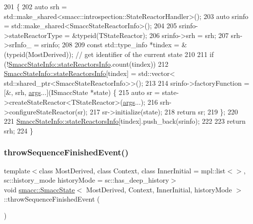 \begin{DoxyCode}
201   \{
202     \textcolor{keyword}{auto} srh = std::make\_shared<smacc::introspection::StateReactorHandler>();
203     \textcolor{keyword}{auto} srinfo = std::make\_shared<SmaccStateReactorInfo>();
204 
205     srinfo->stateReactorType = &\textcolor{keyword}{typeid}(TStateReactor);
206     srinfo->srh = srh;
207     srh->srInfo\_ = srinfo;
208 
209     \textcolor{keyword}{const} std::type\_info *tindex = &(\textcolor{keyword}{typeid}(MostDerived)); \textcolor{comment}{// get identifier of the current state}
210 
211     \textcolor{keywordflow}{if} (!\hyperlink{classsmacc_1_1introspection_1_1SmaccStateInfo_abd1d6ca5060c87f6bd11fde3e5b2ac4d}{SmaccStateInfo::stateReactorsInfo}.count(tindex))
212       \hyperlink{classsmacc_1_1introspection_1_1SmaccStateInfo_abd1d6ca5060c87f6bd11fde3e5b2ac4d}{SmaccStateInfo::stateReactorsInfo}[tindex] = std::vector<
      std::shared\_ptr<SmaccStateReactorInfo>>();
213 
214     srinfo->factoryFunction = [&, srh, \hyperlink{namespacegenerate__debs_a75f9143e38df82d83b2e8a6f99cae02c}{args}...](ISmaccState *state) \{
215       \textcolor{keyword}{auto} sr = state->createStateReactor<TStateReactor>(\hyperlink{namespacegenerate__debs_a75f9143e38df82d83b2e8a6f99cae02c}{args}...);
216       srh->configureStateReactor(sr);
217       sr->initialize(state);
218       \textcolor{keywordflow}{return} sr;
219     \};
220 
221     \hyperlink{classsmacc_1_1introspection_1_1SmaccStateInfo_abd1d6ca5060c87f6bd11fde3e5b2ac4d}{SmaccStateInfo::stateReactorsInfo}[tindex].push\_back(srinfo);
222 
223     \textcolor{keywordflow}{return} srh;
224   \}
\end{DoxyCode}
\mbox{\label{classsmacc_1_1SmaccState_a49dcfc25824f7e083dd4b999c49ab2b6}} 
\subsubsection{\texorpdfstring{throw\+Sequence\+Finished\+Event()}{throwSequenceFinishedEvent()}}
{\footnotesize\ttfamily template$<$class Most\+Derived, class Context, class Inner\+Initial = mpl\+::list$<$$>$, sc\+::history\+\_\+mode history\+Mode = sc\+::has\+\_\+deep\+\_\+history$>$ \\
void \hyperlink{classsmacc_1_1SmaccState}{smacc\+::\+Smacc\+State}$<$ Most\+Derived, Context, Inner\+Initial, history\+Mode $>$\+::throw\+Sequence\+Finished\+Event (\begin{DoxyParamCaption}{ }\end{DoxyParamCaption})\hspace{0.3cm}{\ttfamily [inline]}}



